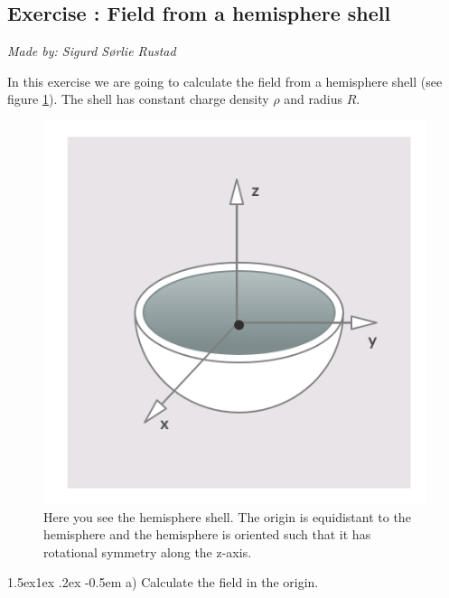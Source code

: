 \documentclass[%
oneside,                 %
final,                   %
10pt]{article}
\makeatletter
\newenvironment{doconceexercise}{}{}
\newcounter{doconceexercisecounter}
\newcommand\subex{\@startsection{paragraph}{4}{\z@}%
                  {1.5ex\@plus1ex \@minus.2ex}%
                  {-0.5em}%
                  {\normalfont\normalsize\bfseries}}
\makeatother
\begin{document}

\newcommand{\exercisesection}[1]{\subsection*{#1}}





\begin{doconceexercise}

\exercisesection{Exercise \thedoconceexercisecounter: Field from a hemisphere shell}


\emph{Made by: Sigurd Sørlie Rustad}

\noindent
In this exercise we are going to calculate the field from a hemisphere shell (see figure \ref{fig:hemisphere}). The shell has constant charge density $\rho$ and radius $R$.

\begin{figure}[!ht]  %
  \centerline{\includegraphics[width=0.8\linewidth]{halvkule.png}}
  \caption{
  Here you see the hemisphere shell. The origin is equidistant to the hemisphere and the hemisphere is oriented such that it has rotational symmetry along the z-axis. \label{fig:hemisphere}
  }
\end{figure}



\subex{a)}
Calculate the field in the origin.



\end{doconceexercise}
\end{document}

